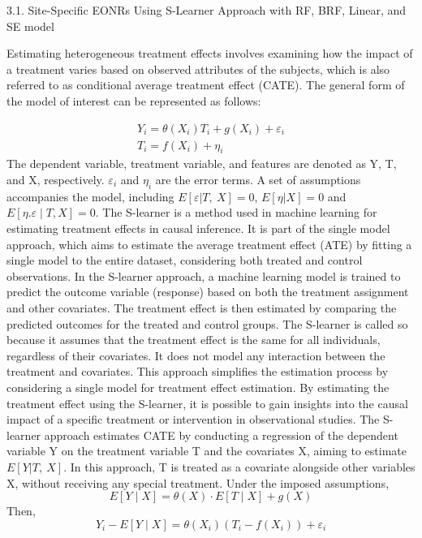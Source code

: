 \documentclass[
  12pt,
]{article}
\begin{document}
3.1. Site-Specific EONRs Using S-Learner Approach with RF, BRF, Linear, and SE model

Estimating heterogeneous treatment effects involves examining how the impact of a treatment varies based on observed attributes of the subjects, which is also referred to as conditional average treatment effect (CATE).
The general form of the model of interest can be represented as follows:

\[
\begin{gathered}
Y_i=\theta\left(X_i\right) T_i+g\left(X_i\right)+\varepsilon_i \\
T_i=f\left(X_i\right)+\eta_i
\end{gathered}
\]
The dependent variable, treatment variable, and features are denoted as Y, T, and X, respectively. \(\varepsilon_i\) and \(\eta_i\) are the error terms.
A set of assumptions accompanies the model, including \(E[\varepsilon|T,\ X]=0\), \(E[\eta|X]=0\)
and \(E\left[\eta.\varepsilon\middle| T,X\right]=0\).
The S-learner is a method used in machine learning for estimating treatment effects in causal inference. It is part of the single model approach, which aims to estimate the average treatment effect (ATE) by fitting a single model to the entire dataset, considering both treated and control observations.
In the S-learner approach, a machine learning model is trained to predict the outcome variable (response) based on both the treatment assignment and other covariates. The treatment effect is then estimated by comparing the predicted outcomes for the treated and control groups.
The S-learner is called so because it assumes that the treatment effect is the same for all individuals, regardless of their covariates. It does not model any interaction between the treatment and covariates. This approach simplifies the estimation process by considering a single model for treatment effect estimation.
By estimating the treatment effect using the S-learner, it is possible to gain insights into the causal impact of a specific treatment or intervention in observational studies.
The S-learner approach estimates CATE by conducting a regression of the dependent variable Y on the treatment variable T and the covariates X, aiming to estimate \(E[Y|T,\ X]\). In this approach, T is treated as a covariate alongside other variables X, without receiving any special treatment.
Under the imposed assumptions,
\[
E[Y \mid X]=\theta(X) \cdot E[T \mid X]+g(X)
\]
Then,
\[
Y_i-E[Y \mid X]=\theta\left(X_i\right)\left(T_i-f\left(X_i\right)\right)+\varepsilon_i
\]
\end{document}
